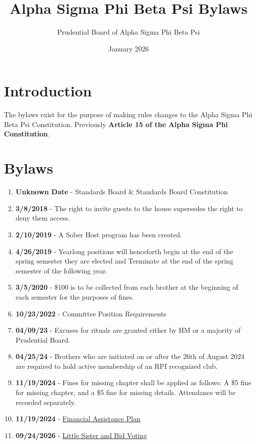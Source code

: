 \documentclass{article}
\title{Alpha Sigma Phi Beta Psi Bylaws}
\author{Prudential Board of Alpha Sigma Phi Beta Psi}
\date{January 2026}
\begin{document}
	
	\maketitle
	
	\section*{Introduction}
	
	The bylaws exist for the purpose of making rules changes to the Alpha Sigma Phi Beta Psi Constitution. Previously \textbf{Article 15 of the Alpha Sigma Phi Constitution}.
	
	\section*{Bylaws}
	\begin{enumerate}
		\item \textbf{Unknown Date} - Standards Board \& Standards Board Constitution
		\item \textbf{3/8/2018} - The right to invite guests to the house supersedes the right to deny them access.
		\item \textbf{2/10/2019} - A Sober Host program has been created.
		\item \textbf{4/26/2019} - Yearlong positions will henceforth begin at the end of the spring semester they are elected and Terminate at the end of the spring semester of the following year.
		\item \textbf{3/5/2020} - \$100 is to be collected from each brother at the beginning of each semester for the purposes of fines.
		\item \textbf{10/23/2022} - Committee Position Requirements
		\item \textbf{04/09/23} - Excuses for rituals are granted either by HM or a majority of Prudential Board.
		\item \textbf{04/25/24} - Brothers who are initiated on or after the 26th of August 2024 are required to hold active membership of an RPI recognized club.
		\item \textbf{11/19/2024} - Fines for missing chapter shall be applied as follows: A \$5 fine for missing chapter, and a \$5 fine for missing details. Attendance will be recorded separately.
		\item \textbf{11/19/2024} - \href{./Zachary_Polo_Financial_Assistance_Plan.pdf}{Financial Assistance Plan}
		\item \textbf{09/24/2026} - \href{./Little_Sister_and_Bid_Voting.pdf}{Little Sister and Bid Voting}
	\end{enumerate}
	
	
	
	
\end{document}

